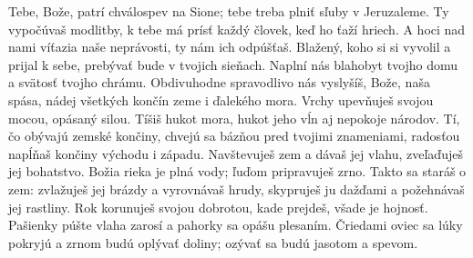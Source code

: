 Tebe, Bože, patrí chválospev na Sione;
tebe treba plniť sľuby v Jeruzaleme.
\versseparator
Ty vypočúvaš modlitby,
k tebe má prísť každý človek, keď ho ťaží hriech.
\versseparator
A hoci nad nami víťazia naše neprávosti,
ty nám ich odpúšťaš.
\versseparator
Blažený, koho si si vyvolil a prijal k sebe,
prebývať bude v tvojich sieňach.
\versseparator
Naplní nás blahobyt tvojho domu
a svätosť tvojho chrámu.
Obdivuhodne spravodlivo nás vyslyšíš,
\versseparator
Bože, naša spása,
nádej všetkých končín zeme i ďalekého mora.
\versseparator
Vrchy upevňuješ svojou mocou,
opásaný silou.
Tíšiš hukot mora,
hukot jeho vĺn
\versseparator
aj nepokoje národov.
Tí, čo obývajú zemské končiny,
chvejú sa bázňou pred tvojimi znameniami,
radosťou napĺňaš končiny východu i západu.
\versseparator
Navštevuješ zem a dávaš jej vlahu,
zveľaďuješ jej bohatstvo.
\versseparator
Božia rieka je plná vody;
ľuďom pripravuješ zrno.
Takto sa staráš o zem:
zvlažuješ jej brázdy a vyrovnávaš hrudy,
skypruješ ju dažďami a požehnávaš jej rastliny.
\versseparator
Rok korunuješ svojou dobrotou,
kade prejdeš, všade je hojnosť.
\versseparator
Pašienky púšte vlaha zarosí
a pahorky sa opášu plesaním.
\versseparator
Čriedami oviec sa lúky pokryjú
a zrnom budú oplývať doliny;
ozývať sa budú jasotom a spevom.